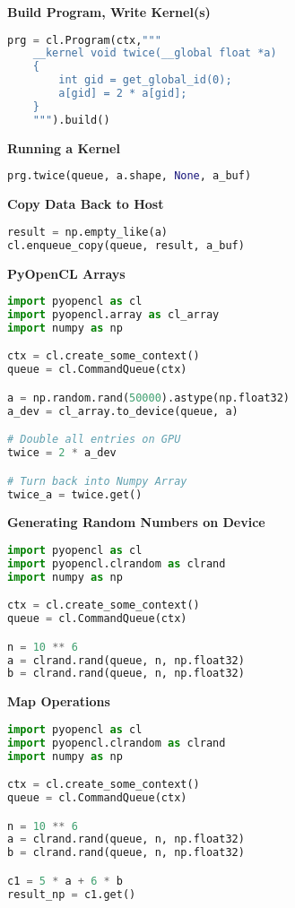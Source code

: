 \documentclass{article}
\begin{document}
\textbf{Build Program, Write Kernel(s)}

\begin{lstlisting}[language=Python]
prg = cl.Program(ctx,"""
    __kernel void twice(__global float *a)
    {
        int gid = get_global_id(0);
        a[gid] = 2 * a[gid];
    }
    """).build()
\end{lstlisting}

\textbf{Running a Kernel}

\begin{lstlisting}[language=Python]
prg.twice(queue, a.shape, None, a_buf)
\end{lstlisting}

\textbf{Copy Data Back to Host}

\begin{lstlisting}[language=Python]
result = np.empty_like(a)
cl.enqueue_copy(queue, result, a_buf)
\end{lstlisting}

\textbf{PyOpenCL Arrays}

\begin{lstlisting}[language=Python]
import pyopencl as cl
import pyopencl.array as cl_array
import numpy as np

ctx = cl.create_some_context()
queue = cl.CommandQueue(ctx)

a = np.random.rand(50000).astype(np.float32)
a_dev = cl_array.to_device(queue, a)

# Double all entries on GPU
twice = 2 * a_dev

# Turn back into Numpy Array
twice_a = twice.get()
\end{lstlisting}

\textbf{Generating Random Numbers on Device}

\begin{lstlisting}[language=Python]
import pyopencl as cl
import pyopencl.clrandom as clrand
import numpy as np

ctx = cl.create_some_context()
queue = cl.CommandQueue(ctx)

n = 10 ** 6  
a = clrand.rand(queue, n, np.float32) 
b = clrand.rand(queue, n, np.float32)
\end{lstlisting}


\textbf{Map Operations}
\begin{lstlisting}[language=Python]
import pyopencl as cl
import pyopencl.clrandom as clrand
import numpy as np

ctx = cl.create_some_context()
queue = cl.CommandQueue(ctx)

n = 10 ** 6  
a = clrand.rand(queue, n, np.float32) 
b = clrand.rand(queue, n, np.float32)

c1 = 5 * a + 6 * b
result_np = c1.get()
\end{lstlisting}
\end{document}
